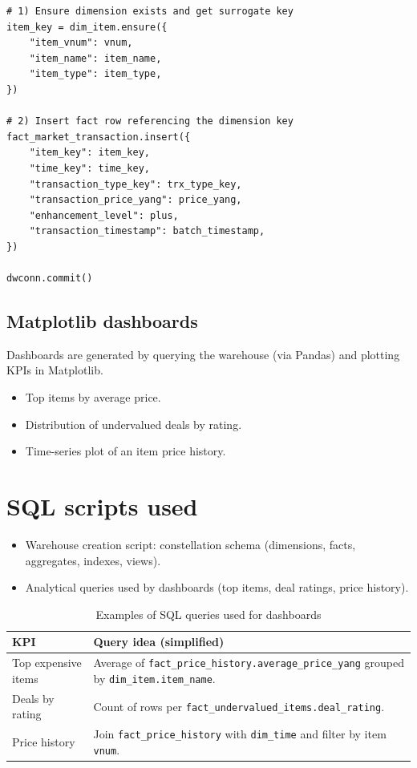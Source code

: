 \begin{lstlisting}[style=python,caption={Simplified loading pattern with pygramETL (dimension ensure + fact insert)}]
# 1) Ensure dimension exists and get surrogate key
item_key = dim_item.ensure({
    "item_vnum": vnum,
    "item_name": item_name,
    "item_type": item_type,
})

# 2) Insert fact row referencing the dimension key
fact_market_transaction.insert({
    "item_key": item_key,
    "time_key": time_key,
    "transaction_type_key": trx_type_key,
    "transaction_price_yang": price_yang,
    "enhancement_level": plus,
    "transaction_timestamp": batch_timestamp,
})

dwconn.commit()
\end{lstlisting}

\subsection{Matplotlib dashboards}
Dashboards are generated by querying the warehouse (via Pandas) and plotting KPIs in Matplotlib.
\begin{itemize}
  \item Top items by average price.
  \item Distribution of undervalued deals by rating.
  \item Time-series plot of an item price history.
\end{itemize}


\section{SQL scripts used}
\begin{itemize}
  \item Warehouse creation script: constellation schema (dimensions, facts, aggregates, indexes, views).
  \item Analytical queries used by dashboards (top items, deal ratings, price history).
\end{itemize}

\begin{table}[!ht]
\centering
\caption{Examples of SQL queries used for dashboards}
\begin{tabularx}{\linewidth}{@{}lX@{}}
\toprule
\textbf{KPI} & \textbf{Query idea (simplified)} \\
\midrule
Top expensive items & Average of \texttt{fact\_price\_history.average\_price\_yang} grouped by \texttt{dim\_item.item\_name}. \\
Deals by rating & Count of rows per \texttt{fact\_undervalued\_items.deal\_rating}. \\
Price history & Join \texttt{fact\_price\_history} with \texttt{dim\_time} and filter by item \texttt{vnum}. \\
\bottomrule
\end{tabularx}
\end{table}

